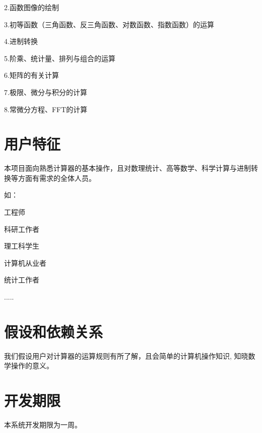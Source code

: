 2.函数图像的绘制

3.初等函数（三角函数、反三角函数、对数函数、指数函数）的运算

4.进制转换

5.阶乘、统计量、排列与组合的运算

6.矩阵的有关计算

7.极限、微分与积分的计算

8.常微分方程、FFT的计算\\

\section{用户特征}

本项目面向熟悉计算器的基本操作，且对数理统计、高等数学、科学计算与进制转换等方面有需求的全体人员。

如：

\quad 工程师

\quad 科研工作者

\quad 理工科学生

\quad 计算机从业者

\quad 统计工作者

\quad .....



\section{假设和依赖关系}

我们假设用户对计算器的运算规则有所了解，且会简单的计算机操作知识, 知晓数学操作的意义。

\section{开发期限}

本系统开发期限为一周。\\

